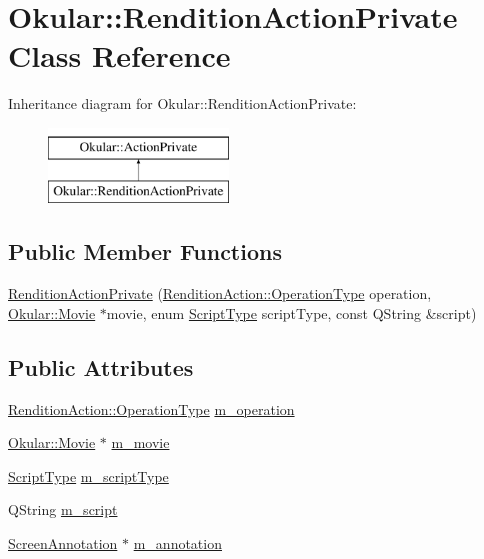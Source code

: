 \hypertarget{classOkular_1_1RenditionActionPrivate}{\section{Okular\+:\+:Rendition\+Action\+Private Class Reference}
\label{classOkular_1_1RenditionActionPrivate}
}
Inheritance diagram for Okular\+:\+:Rendition\+Action\+Private\+:\begin{figure}[H]
\begin{center}
\leavevmode
\includegraphics[height=2.000000cm]{classOkular_1_1RenditionActionPrivate}
\end{center}
\end{figure}
\subsection*{Public Member Functions}
\begin{DoxyCompactItemize}
\item 
\hyperlink{classOkular_1_1RenditionActionPrivate_ab6761f32bfd007f96b2b19d697edee4d}{Rendition\+Action\+Private} (\hyperlink{classOkular_1_1RenditionAction_ae036a78aa4d9997df70e856410cbc1a5}{Rendition\+Action\+::\+Operation\+Type} operation, \hyperlink{classOkular_1_1Movie}{Okular\+::\+Movie} $\ast$movie, enum \hyperlink{namespaceOkular_a061f34ff835b2d2142fef28bcfd09325}{Script\+Type} script\+Type, const Q\+String \&script)
\end{DoxyCompactItemize}
\subsection*{Public Attributes}
\begin{DoxyCompactItemize}
\item 
\hyperlink{classOkular_1_1RenditionAction_ae036a78aa4d9997df70e856410cbc1a5}{Rendition\+Action\+::\+Operation\+Type} \hyperlink{classOkular_1_1RenditionActionPrivate_a972d966b5a17b9ba40576e16d07b3ae1}{m\+\_\+operation}
\item 
\hyperlink{classOkular_1_1Movie}{Okular\+::\+Movie} $\ast$ \hyperlink{classOkular_1_1RenditionActionPrivate_ac2021ae7a38f8aa5a7f2f07b6239910b}{m\+\_\+movie}
\item 
\hyperlink{namespaceOkular_a061f34ff835b2d2142fef28bcfd09325}{Script\+Type} \hyperlink{classOkular_1_1RenditionActionPrivate_a438c9fa329e2e9c47bf4b103f83493dc}{m\+\_\+script\+Type}
\item 
Q\+String \hyperlink{classOkular_1_1RenditionActionPrivate_a1f917096d272f4dcaa6fcb224713fba8}{m\+\_\+script}
\item 
\hyperlink{classOkular_1_1ScreenAnnotation}{Screen\+Annotation} $\ast$ \hyperlink{classOkular_1_1RenditionActionPrivate_a6fc33bd8ab51d42adc20eeed334bb159}{m\+\_\+annotation}
\end{DoxyCompactItemize}


